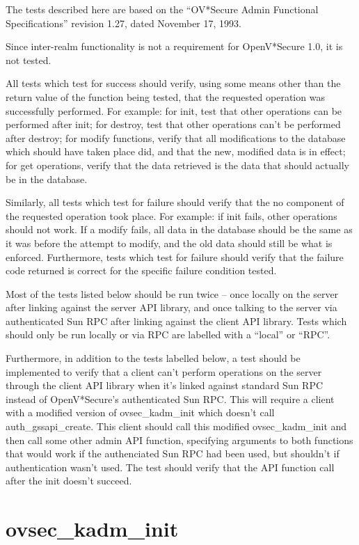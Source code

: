The tests described here are based on the ``OV*Secure Admin Functional
Specifications'' revision 1.27, dated November 17, 1993.

Since inter-realm functionality is not a requirement for OpenV*Secure
1.0, it is not tested.

All tests which test for success should verify, using some means other
than the return value of the function being tested, that the requested
operation was successfully performed.  For example: for init, test
that other operations can be performed after init; for destroy, test
that other operations can't be performed after destroy; for modify
functions, verify that all modifications to the database which should
have taken place did, and that the new, modified data is in effect;
for get operations, verify that the data retrieved is the data that
should actually be in the database.

Similarly, all tests which test for failure should verify that the
no component of the requested operation took place.  For example: if
init fails, other operations should not work.  If a modify fails, all
data in the database should be the same as it was before the attempt
to modify, and the old data should still be what is enforced.
Furthermore, tests which test for failure should verify that the
failure code returned is correct for the specific failure condition
tested.

Most of the tests listed below should be run twice -- once locally on
the server after linking against the server API library, and once
talking to the server via authenticated Sun RPC after linking against
the client API library.  Tests which should only be run locally or via
RPC are labelled with a ``local'' or ``RPC''.

Furthermore, in addition to the tests labelled below, a test should be
implemented to verify that a client can't perform operations on the
server through the client API library when it's linked against
standard Sun RPC instead of OpenV*Secure's authenticated Sun RPC.
This will require a client with a modified version of ovsec_kadm_init
which doesn't call auth_gssapi_create.  This client should call this
modified ovsec_kadm_init and then call some other admin API function,
specifying arguments to both functions that would work if the
authenciated Sun RPC had been used, but shouldn't if authentication
wasn't used.  The test should verify that the API function call after
the init doesn't succeed.

\section{ovsec_kadm_init}

